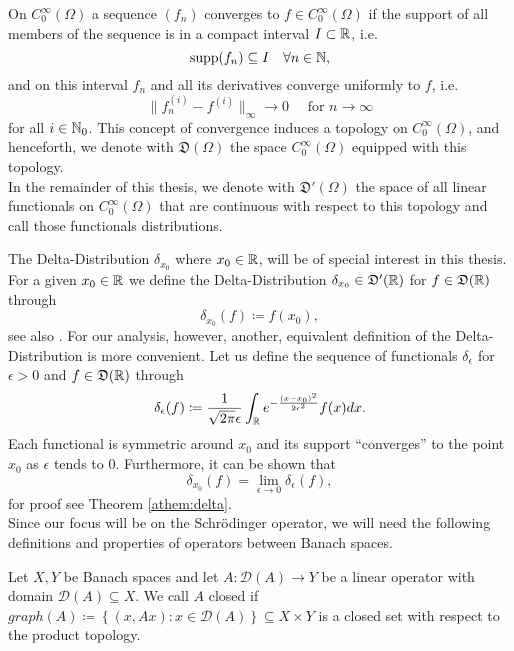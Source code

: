 \begin{definition}[Distributions]
	On $C_{0}^{\infty}(\Omega)$ a sequence $(f_{n})$ converges to $f \in C_{0}^{\infty}(\Omega)$ if the support of all members of the sequence is in a compact interval $I \subset \mathbb{R}$, i.e.
	$$ \operatorname{supp} (f_{n}) \subseteq I \quad \forall n \in \mathbb{N}, $$
	and on this interval $f_{n}$ and all its derivatives converge uniformly to $f$, i.e.
	\[ \| f_{n}^{(i)} - f^{(i)} \|_{\infty} \rightarrow 0 \quad \text{ for } n \rightarrow \infty \]
	for all $i \in \mathbb{N}_{0}$. This concept of convergence induces a topology on $C_{0}^{\infty}(\Omega)$, and henceforth, we denote with $\mathfrak{D}(\Omega)$ the space $C_{0}^{\infty}(\Omega)$ equipped with this topology.
~\\

	In the remainder of this thesis, we denote with $\mathfrak{D}'(\Omega)$ the space of all linear functionals on $C_{0}^{\infty}(\Omega)$ that are continuous with respect to this topology and call those functionals distributions.  
\end{definition}

The Delta-Distribution $\delta_{x_{0}}$ where $x_{0} \in \mathbb{R}$, will be of special interest in this thesis. For a given $x_{0} \in \mathbb{R}$ we define the Delta-Distribution $\delta_{x_{0}} \in \mathfrak{D}'(\mathbb{R})$ for $f \in \mathfrak{D}(\mathbb{R})$ through
		\[  \delta_{x_{0}}(f) \coloneqq f(x_{0}), \]
	see also \cite[p. 429]{werner2006funkana}. For our analysis, however, another, equivalent definition of the Delta-Distribution is more convenient. Let us define the sequence of functionals $\delta_{\epsilon}$ for $\epsilon > 0$ and $f \in \mathfrak{D}(\mathbb{R})$ through
	\begin{equation}
		\delta_{\epsilon}(f) \coloneqq \frac{1}{\sqrt{2 \pi} \epsilon} \int_{\mathbb{R}} e^{-\frac{(x - x_{0})^{2}}{2 \epsilon^{2}}} f(x) dx. \label{eq:2.1-smooth_potential}
	\end{equation}
 	Each functional is symmetric around $x_{0}$ and its support \enquote{converges} to the point $x_{0}$ as $\epsilon$ tends to $0$. Furthermore, it can be shown that
 	\[ \delta_{x_{0}}(f) = \lim_{\epsilon \rightarrow 0} \delta_{\epsilon}(f), \]
 	for proof see Theorem \ref{athem:delta}.
~\\

Since our focus will be on the Schrödinger operator, we will need the following definitions and properties of operators between Banach spaces.
\begin{definition} 
Let $X, Y$ be Banach spaces and let $A \colon \mathcal{D}(A) \rightarrow Y$ be a linear operator with domain $\mathcal{D}(A) \subseteq X$. We call $A$ closed if $graph(A) \coloneqq \left\{ (x, Ax) : x \in \mathcal{D}(A) \right\} \subseteq X \times Y$ is a closed set with respect to the product topology.
\end{definition}

